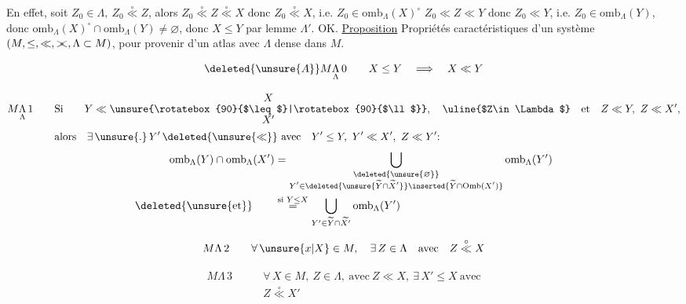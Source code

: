 En effet, soit $Z_0\in\Lambda,\ Z_0\overset{\circ}{\ll} Z$, alors $Z_0\overset{\circ}{\ll} Z\overset{\circ}{\ll} X$ donc $Z_0\overset{\circ}{\ll} X$,  i.e. $Z_0\in \mathrm{omb}_{\Lambda}(X)^\circ$ $Z_0\ll Z\ll Y$ donc $Z_0\ll Y$, i.e. $Z_0\in \mathrm{omb}_{\Lambda}(Y)$, donc $\mathrm{omb}_{\Lambda}(X)^\circ\cap \mathrm{omb}_{\Lambda}(Y)\ne\varnothing$, donc $X\leq Y$ par lemme $\Lambda'$. OK.
\uline{Proposition} Propriétés caractéristiques d'un système $(M,\leq,\ll,\mathrel{\rlap{$>$}<},\Lambda\subset M)$, pour provenir d'un atlas avec $\Lambda$ dense dans $M$.

\[
\deleted{\unsure{A}}M\underset{\Lambda}{\Lambda}\,0\qquad X\leq Y\quad\Longrightarrow\quad X\ll Y
\]

\[
\begin{aligned}
M\underset{\Lambda}{\Lambda}\,1\qquad&\text{Si}\qquad Y\ll \begin{matrix}X\\[-.4ex]\unsure{\rotatebox{90}{$\leq$}|\rotatebox{90}{$\ll$}}\\[-.4ex]X'\end{matrix},\quad \text{\uline{$Z\in\Lambda$}}\quad\text{et}\quad Z\ll Y,\ Z\ll X',\\
&\text{alors}\quad \exists\,\unsure{\mathord{.}}\,Y'\,\deleted{\unsure{\ll}}\ \text{avec}\quad Y'\leq Y,\ Y'\ll X',\ Z\ll Y'\mathpunct{:}
\end{aligned}
\]
\[
\begin{aligned}
\mathrm{omb}_{\Lambda}(Y)\cap \mathrm{omb}_{\Lambda}(X')&=\bigcup_{\substack{\deleted{\unsure{\varnothing}}\\Y'\in\deleted{\unsure{\widetilde Y\cap\widetilde X'}}\inserted{\widetilde Y\cap\mathrm{Omb}(X')}}}\mathrm{omb}_{\Lambda}(Y')\\
\deleted{\unsure{\text{et}}}\qquad&\overset{\text{si }Y\leq X}{=}\bigcup_{Y'\in\widetilde Y\cap\widetilde{X'}}\mathrm{omb}_{\Lambda}(Y')
\end{aligned}
\]

\[
M\Lambda\,2\qquad \forall\,\unsure{x|X}\in M,\quad\exists\,Z\in\Lambda\quad\text{avec}\quad Z\overset{\circ}{\ll} X
\]

\[
\begin{aligned}
M\Lambda\,3\qquad&\forall\,X\in M,\ Z\in\Lambda,\ \text{avec}\ Z\ll X,\ \exists\,X'\leq X\ \text{avec}\\
&Z\overset{\circ}{\ll} X'
\end{aligned}
\]

